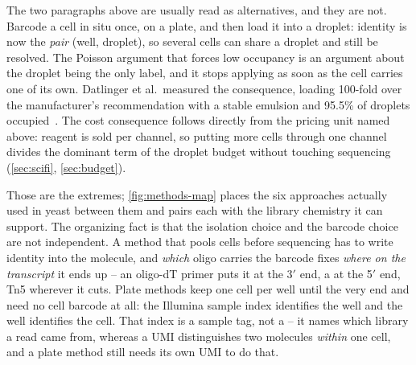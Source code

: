  The two paragraphs above are
usually read as alternatives, and they are not. Barcode a cell in situ once, on a
plate, and then load it into a droplet: identity is now the \emph{pair} (well,
droplet), so several cells can share a droplet and still be resolved. The Poisson
argument that forces low occupancy is an argument about the droplet being the
only label, and it stops applying as soon as the cell carries one of its own.
Datlinger et al.\ measured the consequence, loading 100-fold over the
manufacturer's recommendation with a stable emulsion and 95.5\% of droplets
occupied~\citep{datlingerUltrahighthroughputSinglecellRNA2021}. The cost
consequence follows directly from the pricing unit named above: reagent is sold
per channel, so putting more cells through one channel divides the dominant term
of the droplet budget without touching sequencing (\cref{sec:scifi},
\cref{sec:budget}).

 Those are the extremes;
\cref{fig:methods-map} places the six approaches actually used in yeast between
them and pairs each with the library chemistry it can support. The organizing fact
is that the isolation choice and the barcode choice are not independent. A method
that pools cells before sequencing has to write identity into the molecule, and
\emph{which} oligo carries the barcode fixes \emph{where on the transcript} it
ends up -- an oligo-dT primer puts it at the 3$'$ end, a
 at the 5$'$ end, Tn5 wherever it cuts. Plate
methods keep one cell per well until the very end and need no cell barcode at
all: the Illumina sample index identifies the well and the well identifies the
cell. That index is a sample tag, not a  -- it
names which library a read came from, whereas a UMI distinguishes two molecules
\emph{within} one cell, and a plate method still needs its own UMI to do that.

